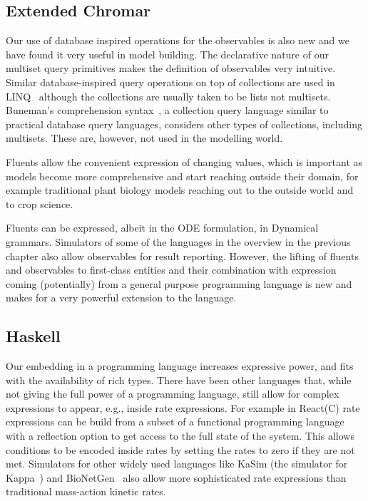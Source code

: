 \subsection{Extended Chromar}
Our use of database inspired operations for the observables is also new and we
have found it very useful in model building. The declarative nature of our
multiset query primitives makes the definition of observables very
intuitive. Similar database-inspired query operations on top of collections are
used in LINQ~\citep{budiu_compiler_2013} although the collections are usually taken
to be lists not multisets. Buneman's comprehension
syntax~\citep{buneman_comprehension_1994}, a collection query language similar to
practical database query languages, considers other types of collections,
including multisets. These are, however, not used in the modelling world.

Fluents allow the convenient expression of changing values, which is
important as models become more comprehensive and start reaching outside their
domain, for example traditional plant biology models reaching out to the outside
world and to crop science.

Fluents can be expressed, albeit in the ODE formulation, in Dynamical
grammars. Simulators of some of the languages in the overview in the previous
chapter also allow observables for result reporting. However, the lifting of
fluents and observables to first-class entities and their combination with
expression coming (potentially) from a general purpose programming language is
new and makes for a very powerful extension to the language.

\subsection{Haskell}
Our embedding in a programming language increases expressive power, and fits
with the availability of rich types.  There have been other languages that,
while not giving the full power of a programming language, still allow for
complex expressions to appear, e.g., inside rate expressions. For example in
React(C) \citep{john_biochemical_2011} rate expressions can be build from a subset
of a functional programming language with a reflection option to get access to
the full state of the system. This allows conditions to be encoded inside rates
by setting the rates to zero if they are not met. Simulators for other widely
used languages like KaSim (the simulator for Kappa~\citep{danos2008}) and
BioNetGen~\citep{blinov_bionetgen:_2004} also allow more sophisticated rate
expressions than traditional mass-action kinetic rates.

